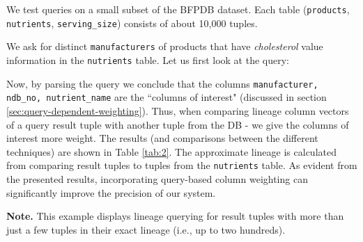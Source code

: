 \begin{example-withrun}
\end{example-withrun}


\begin{runexample}
We test queries on a small subset of the BFPDB dataset. Each table (\texttt{products}, \texttt{nutrients}, \texttt{serving\_size}) consists of about 10,000 tuples.
\end{runexample}

\begin{example-withrun}\label{experiment:2}
% 
We ask for distinct \texttt{manufacturers} of products that have \textit{cholesterol} value information in the \texttt{nutrients} table. Let us first look at the query:


Now, by parsing the query we conclude that the columns \texttt{manufacturer, ndb\_no, nutrient\_name} are the ``columns of interest" (discussed in section \ref{sec:query-dependent-weighting}). Thus, when comparing lineage column vectors of a query result tuple with another tuple from the DB - we give the columns of interest more weight. The results (and comparisons between the different techniques) are shown in Table \ref{tab:2}. The approximate lineage is calculated from comparing result tuples to tuples from the \texttt{nutrients} table. As evident from the presented results, incorporating query-based column weighting can significantly improve the precision of our system. 
\par\textbf{Note.} This example displays lineage querying for result tuples with more than just a few tuples in their exact lineage (i.e., up to two hundreds).

\end{example-withrun}

